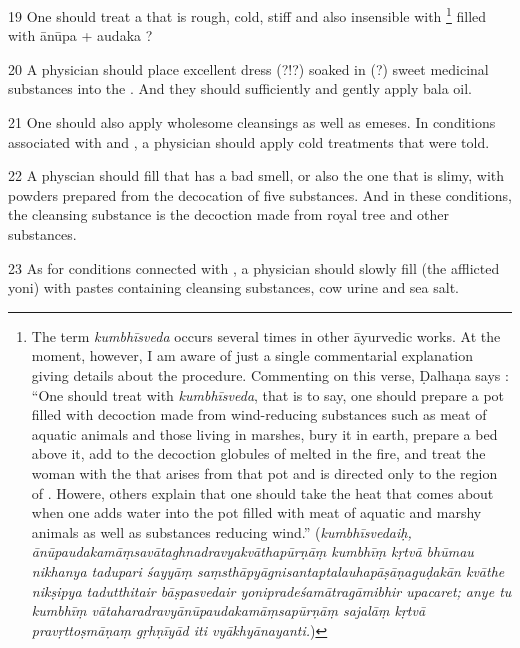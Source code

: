 \begin{translation}
\item [19]
One should treat a  that is rough, cold, stiff and also insensible with %
	\footnote{%
	The term \textit{kumbhīsveda} occurs several times in other āyurvedic works. At the moment, however, I am aware of just a single commentarial explanation giving details about the procedure. 
	Commenting on this verse, Ḍalhaṇa says \parencite[670a]{vulgate}: 
		``One should treat with \textit{kumbhīsveda}, that is to say, one should prepare a pot filled with decoction made from wind-reducing substances such as meat of aquatic animals and those living in marshes, bury it in earth, prepare a bed above it, add to the decoction globules of  melted in the fire, and treat the woman with the  that arises from that pot and is directed only to the region of . Howere, others explain that one should take the heat that comes about when one adds water into the pot filled with meat of aquatic and marshy animals as well as substances reducing wind.''
	 		(\textit{kumbhīsvedaiḥ, ānūpaudakamāṃsavātaghnadravyakvāthapūrṇāṃ kumbhīṃ kṛtvā bhūmau nikhanya tadupari śayyāṃ saṃsthāpyāgnisantaptalauhapāṣāṇaguḍakān kvāthe nikṣipya tadutthitair bāṣpasvedair yonipradeśamātragāmibhir upacaret; anye tu kumbhīṃ vātaharadravyānūpaudakamāṃsapūrṇāṃ sajalāṃ kṛtvā pravṛttoṣmāṇaṃ gṛhṇīyād iti vyākhyānayanti.})
	} 
filled with ānūpa + audaka ? %

\item [20]
A physician should place excellent dress (?!?) soaked in (?) sweet medicinal substances into the . And they should sufficiently and gently apply bala oil.

\item [21]
One should also apply wholesome cleansings as well as emeses. 
In conditions associated with  and , a physician should apply cold treatments that were told.

\item [22]
A physcian should fill  that has a bad smell, or also the one that is slimy, with powders prepared from the decocation of five substances. And in these conditions, the cleansing substance is the decoction made from royal tree and other substances.

\item [23]
As for conditions connected with , a physician should slowly fill (the afflicted yoni) with pastes containing cleansing substances, cow urine and sea salt.  

\end{translation}
